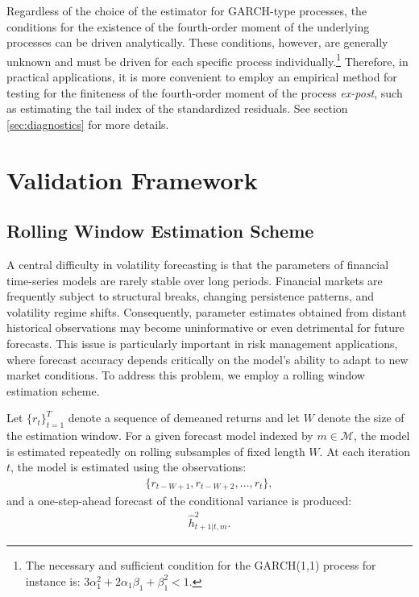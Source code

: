\documentclass{article} %
\begin{document}
	Regardless of the choice of the estimator for GARCH-type processes, the conditions for the existence of the fourth-order moment of the underlying processes can be driven analytically. These conditions, however, are generally unknown and must be driven for each specific process individually.\footnote{The necessary and sufficient condition for the GARCH(1,1) process for instance is: $3\alpha_1^2 + 2\alpha_1 \beta_1 + \beta_1^2 < 1$.} Therefore, in practical applications, it is more convenient to employ an empirical method for testing for the finiteness of the fourth-order moment of the process \textit{ex-post}, such as estimating the tail index of the standardized residuals. See section \ref{sec:diagnostics} for more details.
	
	\section{Validation Framework}\label{sec:valid_fw}
	
	\subsection{Rolling Window Estimation Scheme}\label{sec:rolling-window}
	
	A central difficulty in volatility forecasting is that the parameters of financial time-series models are rarely stable over long periods. Financial markets are frequently subject to structural breaks, changing persistence patterns, and volatility regime shifts. Consequently, parameter estimates obtained from distant historical observations may become uninformative or even detrimental for future forecasts. This issue is particularly important in risk management applications, where forecast accuracy depends critically on the model's ability to adapt to new market conditions. To address this problem, we employ a rolling window estimation scheme.
	
	Let $\{r_t\}_{t=1}^T$ denote a sequence of demeaned returns and let $W$ denote the size of the estimation window. For a given forecast model indexed by $m \in \mathcal{M}$, the model is estimated repeatedly on rolling subsamples of fixed length $W$. At each iteration $t$, the model is estimated using the observations:
	\begin{align}
		\{r_{t-W+1}, r_{t-W+2}, \dots, r_t\},
	\end{align}
	and a one-step-ahead forecast of the conditional variance is produced:
	\begin{align}
		\hat{h}_{t+1|t,m}^2.
	\end{align}
	
\end{document}
